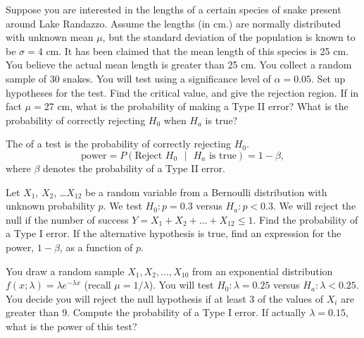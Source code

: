 \clearpage


\ii Suppose you are interested in the lengths of a certain species of snake present around Lake Randazzo. Assume the lengths (in cm.) are normally distributed with unknown mean $\mu$, but the standard deviation of the population is known to be $\sigma = 4$ cm. It has been claimed that the mean length of this species is 25 cm. You believe the actual mean length is greater than 25 cm. You collect a random sample of 30 snakes. You will test using a significance level of $\alpha = 0.05$.
\bb
\ii Set up hypotheses for the test. \vspace{0.6in}
\ii Find the critical value, and give the rejection region. \vfill
\ii If in fact $\mu = 27$ cm, what is the probability of making a Type II error? \vspace{1.5in}
\ii What is the probability of correctly rejecting $H_0$ when $H_a$ is true? \vspace{1in}
\ee
\ee

\bbox
The \textbf{} of a test is the probability of correctly rejecting $H_0$.
\[ \mbox{power} = P(\mbox{Reject $H_0$ \ $|$ \ $H_a$ is true}) = 1 - \beta ,\]
where $\beta$ denotes the probability of a Type II error.
\ebox

\clearpage

\bb[resume]

\ii Let $X_1$, $X_2$, \ldots $X_{12}$ be a random variable from a Bernoulli distribution with unknown probability $p$. We test $H_0: p=0.3$ versus $H_a: p < 0.3$. We will reject the null if the number of success $Y= X_1 + X_2 + \ldots + X_{12} \leq 1$.
\bb
\ii Find the probability of a Type I error.
\ii If the alternative hypothesis is true, find an expression for the power, $1-\beta$, as a function of $p$.
\ee

\vfill

\ii You draw a random sample $X_1, X_2, \ldots , X_{10}$ from an exponential distribution $f(x; \lambda) = \lambda e^{-\lambda x}$ (recall $\mu = 1/\lambda$). You will test $H_0: \lambda = 0.25$ versus $H_a: \lambda < 0.25$. You decide you will reject the null hypothesis if at least 3 of the values  of $X_i$ are greater than 9.
\bb
\ii Compute the probability of a Type I error.
\ii If actually $\lambda = 0.15$, what is the power of this test?
\ee
\vfill
\ee
